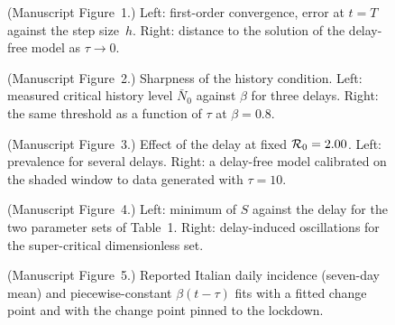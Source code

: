 \documentclass[a4paper]{article}
\newcommand{\calR}{\mathcal{R}}
\begin{document}
\begin{figure}[p]
	\centering
	
	\caption{(Manuscript Figure~1.) Left: first-order convergence, error at
	$t=T$ against the step size~$h$. Right: distance to the solution of the
	delay-free model as $\tau\to0$.}
\end{figure}

\begin{figure}[p]
	\centering
	
	\caption{(Manuscript Figure~2.) Sharpness of the history condition. Left:
	measured critical history level $\bar N_0$ against $\beta$ for three
	delays. Right: the same threshold as a function of $\tau$ at $\beta=0.8$.}
\end{figure}

\begin{figure}[p]
	\centering
	
	\caption{(Manuscript Figure~3.) Effect of the delay at fixed
	$\calR_0 = \expTwoRZero$. Left: prevalence for several delays. Right: a
	delay-free model calibrated on the shaded window to data generated with
	$\tau=10$.}
\end{figure}

\begin{figure}[p]
	\centering
	
	\caption{(Manuscript Figure~4.) Left: minimum of $S$ against the delay for
	the two parameter sets of Table~1. Right: delay-induced oscillations for
	the super-critical dimensionless set.}
\end{figure}

\begin{figure}[p]
	\centering
	
	\caption{(Manuscript Figure~5.) Reported Italian daily incidence
	(seven-day mean) and piecewise-constant $\beta(t-\tau)$ fits with a fitted
	change point and with the change point pinned to the lockdown.}
\end{figure}
\end{document}
